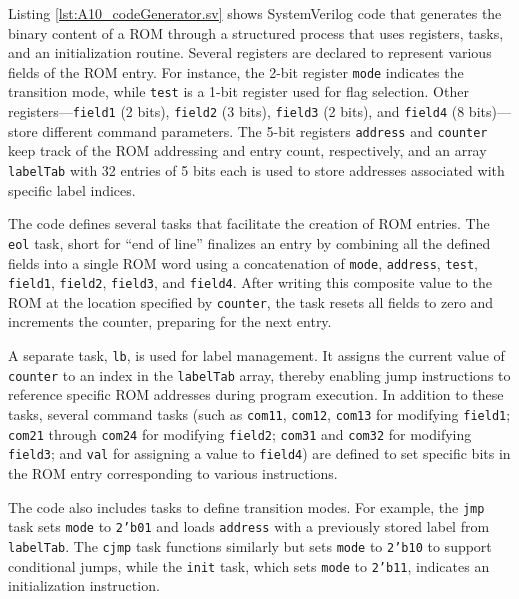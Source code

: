 Listing \ref{lst:A10_codeGenerator.sv} shows SystemVerilog code that generates the binary content of a ROM through a structured process that uses registers, tasks, and an initialization routine. Several registers are declared to represent various fields of the ROM entry. For instance, the 2-bit register \texttt{mode} indicates the transition mode, while \texttt{test} is a 1-bit register used for flag selection. Other registers—\texttt{field1} (2 bits), \texttt{field2} (3 bits), \texttt{field3} (2 bits), and \texttt{field4} (8 bits)—store different command parameters. The 5-bit registers \texttt{address} and \texttt{counter} keep track of the ROM addressing and entry count, respectively, and an array \texttt{labelTab} with 32 entries of 5 bits each is used to store addresses associated with specific label indices.

The code defines several tasks that facilitate the creation of ROM entries. The \texttt{eol} task, short for ``end of line'' finalizes an entry by combining all the defined fields into a single ROM word using a concatenation of \texttt{mode}, \texttt{address}, \texttt{test}, \texttt{field1}, \texttt{field2}, \texttt{field3}, and \texttt{field4}. After writing this composite value to the ROM at the location specified by \texttt{counter}, the task resets all fields to zero and increments the counter, preparing for the next entry.

A separate task, \texttt{lb}, is used for label management. It assigns the current value of \texttt{counter} to an index in the \texttt{labelTab} array, thereby enabling jump instructions to reference specific ROM addresses during program execution. In addition to these tasks, several command tasks (such as \texttt{com11}, \texttt{com12}, \texttt{com13} for modifying \texttt{field1}; \texttt{com21} through \texttt{com24} for modifying \texttt{field2}; \texttt{com31} and \texttt{com32} for modifying \texttt{field3}; and \texttt{val} for assigning a value to \texttt{field4}) are defined to set specific bits in the ROM entry corresponding to various instructions.

The code also includes tasks to define transition modes. For example, the \texttt{jmp} task sets \texttt{mode} to \texttt{2'b01} and loads \texttt{address} with a previously stored label from \texttt{labelTab}. The \texttt{cjmp} task functions similarly but sets \texttt{mode} to \texttt{2'b10} to support conditional jumps, while the \texttt{init} task, which sets \texttt{mode} to \texttt{2'b11}, indicates an initialization instruction.


